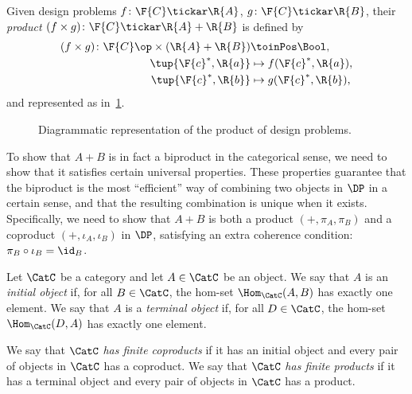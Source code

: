 \begin{definition}
\label{define:product}
Given design problems $f\colon \F{C} \tickar \R{A}$, $g \colon \F{C} \tickar \R{B}$, their \emph{product} $(f \times g)\colon \F{C} \tickar \R{A} + \R{B}$ is defined by
\begin{equation}
\begin{aligned}
    (f \times g) \colon \F{C}\op  \times (\R{A} + \R{B}) & \toinPos \Bool,  \\
            \tup{\F{c}^*, \R{a}} & \mapsto f(\F{c}^*, \R{a}), \\
            \tup{\F{c}^*, \R{b}} & \mapsto g(\F{c}^*, \R{b}),
\end{aligned}
\end{equation}
and represented as in~\cref{fig:productdp}.

\begin{figure}[h!]
\begin{center}
\end{center}
\caption{Diagrammatic representation of the product of design problems. \label{fig:productdp}}
\end{figure}

\end{definition}


To show that $A + B$ is in fact a biproduct in the categorical sense, we need to show that it satisfies certain universal properties. These properties guarantee that the biproduct is the most ``efficient'' way of combining two objects in $\DP$ in a certain sense, and that the resulting combination is unique when it exists. Specifically, we need to show that $A + B$ is both a product $(+, \pi_A, \pi_B)$ and a coproduct $(+, \iota_A, \iota_B)$ in $\DP$, satisfying an extra coherence condition: $\pi_B \circ \iota_B = \id_B$.

\begin{shaded}
\begin{definition}
Let $\CatC$ be a category and let $A \in \CatC$ be an object. We say that $A$ is an \emph{initial object} if, for all $B \in\CatC$, the hom-set $\Hom_\CatC(A,B)$ has exactly one element. We say that $A$ is a \emph{terminal object} if, for all $D\in\CatC$, the hom-set $\Hom_\CatC(D,A)$ has exactly one element.
\end{definition}

\begin{definition}
We say that $\CatC$ \emph{has finite coproducts} if it has an initial object and every pair of objects in $\CatC$ has a coproduct.
We say that $\CatC$ \emph{has finite products} if it has a terminal object and every pair of objects in $\CatC$ has a product.
\end{definition}
\end{shaded}

